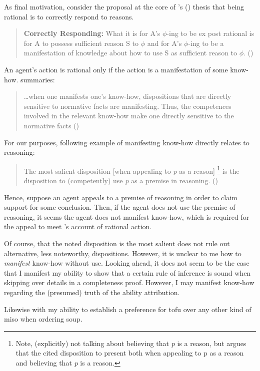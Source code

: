 \begin{note}
  As final motivation, consider the proposal at the core of \citeauthor{Lord:2018aa}'s (\citeyear{Lord:2018aa}) thesis that being rational is to correctly respond to reasons.

  \begin{quote}
    \textbf{Correctly Responding:} What it is for A's \(\phi\)-ing to be ex post rational is for A to possess sufficient reason S to \(\phi\) and for A's \(\phi\)-ing to be a manifestation of knowledge about how to use S as sufficient reason to \(\phi\).\nolinebreak
    \mbox{}\hfill\mbox{(\citeyear[143]{Lord:2018aa})}
  \end{quote}

  An agent's action is rational only if the action is a manifestation of some know-how.
  \citeauthor{Lord:2018aa} summaries:

  \begin{quote}
    \dots when one manifests one's know-how, dispositions that are directly sensitive to normative facts are manifesting. Thus, the competences involved in the relevant know-how make one directly sensitive to the normative facts\nolinebreak
    \mbox{}\hfill\mbox{(\citeyear[16]{Lord:2018aa})}
  \end{quote}

  For our purposes, following example of manifesting know-how directly relates to reasoning:

  \begin{quote}
    The most salient disposition [when appealing to \emph{p} as a reason]\nolinebreak
    \footnote{Note, \citeauthor{Lord:2018aa} (explicitly) not talking about believing that \emph{p} is a reason, but argues that the cited disposition to present both when appealing to p as a reason and believing that \emph{p} is a reason.}
    is the disposition to (competently) use \emph{p} as a premise in reasoning.\nolinebreak
    \mbox{}\hfill\mbox{(\citeyear[25]{Lord:2018aa})}
  \end{quote}

  Hence, suppose an agent appeals to a premise of reasoning in order to claim support for some conclusion.
  Then, if the agent does not use the premise of reasoning, it seems the agent does not manifest know-how, which is required for the appeal to meet \citeauthor{Lord:2018aa}'s account of rational action.

  Of course, that the noted disposition is the most salient does not rule out alternative, less noteworthy, dispositions.
  However, it is unclear to me how to \emph{manifest} know-how without use.
  Looking ahead, it does not seem to be the case that I manifest my ability to show that a certain rule of inference is sound when skipping over details in a completeness proof.
  However, I may manifest know-how regarding the (presumed) truth of the ability attribution.

  Likewise with my ability to establish a preference for tofu over any other kind of miso when ordering soup.
\end{note}

